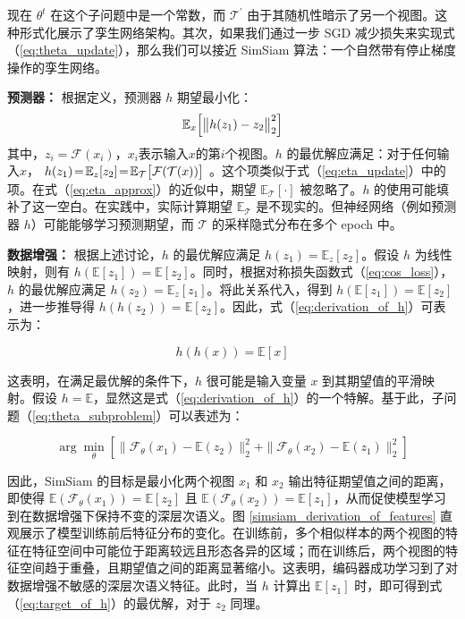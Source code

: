 \documentclass[master]{thesis-uestc}
\begin{document}
现在 $\theta^{t}$ 在这个子问题中是一个常数，而 $\mathcal{T}^{\prime}$ 由于其随机性暗示了另一个视图。这种形式化展示了孪生网络架构。其次，如果我们通过一步 SGD 减少损失来实现式（\ref{eq:theta_update}），那么我们可以接近 SimSiam 算法：一个自然带有停止梯度操作的孪生网络。

\textbf{预测器：} 根据定义，预测器 $h$ 期望最小化：
\begin{equation}
\mathbb{E}_{x}\Big{[}\big{\|}h(z_{1})-z_{2}\big{\|}_{2}^{2}\Big{]} 
\label{eq:target_of_h}
\end{equation}
其中，$z_i = \mathcal{F}(x_i)$，$x_i$表示输入$x$的第$i$个视图。$h$ 的最优解应满足：对于任何输入$x$， $h(z_{1})\!=\!\mathbb{E}_{z}[z_{2}]\!=\!\mathbb{E}_{\mathcal{T}}\big{[}\mathcal{F}( \mathcal{T}(x))\big{]}$ 。这个项类似于式（\ref{eq:eta_update}）中的项。在式（\ref{eq:eta_approx}）的近似中，期望 $\mathbb{E}_{\mathcal{T}}[\cdot]$ 被忽略了。$h$ 的使用可能填补了这一空白。在实践中，实际计算期望 $\mathbb{E}_{\mathcal{T}}$ 是不现实的。但神经网络（例如预测器 $h$）可能能够学习预测期望，而 $\mathcal{T}$ 的采样隐式分布在多个 epoch 中。

\textbf{数据增强：} 根据上述讨论，$h$ 的最优解应满足 $h(z_1) = \mathbb{E}_z[z_2]$。假设 $h$ 为线性映射，则有 $h(\mathbb{E}[z_1]) = \mathbb{E}[z_2]$。同时，根据对称损失函数式（\ref{eq:cos_loss}），$h$ 的最优解应满足 $h(z_2) = \mathbb{E}_z[z_1]$。将此关系代入，得到 $h(\mathbb{E}[z_1]) = \mathbb{E}[z_2]$，进一步推导得 $h(h(z_2)) = \mathbb{E}[z_2]$。因此，式（\ref{eq:derivation_of_h}）可表示为：

\begin{equation}
    h(h(x)) = \mathbb{E}[x]
    \label{eq:derivation_of_h}
\end{equation}

这表明，在满足最优解的条件下，$h$ 很可能是输入变量 $x$ 到其期望值的平滑映射。假设 $h = \mathbb{E}$，显然这是式（\ref{eq:derivation_of_h}）的一个特解。基于此，子问题（\ref{eq:theta_subproblem}）可以表述为：

\begin{equation}
    \arg\min_{\theta} \left[\| \mathcal{F}_{\theta}(x_1) - \mathbb{E}(z_2) \|_2^2 + \| \mathcal{F}_{\theta}(x_2) - \mathbb{E}(z_1) \|_2^2 \right]
\end{equation}

因此，SimSiam 的目标是最小化两个视图 \( x_1 \) 和 \( x_2 \) 输出特征期望值之间的距离，即使得 \( \mathbb{E}(\mathcal{F}_\theta(x_1)) = \mathbb{E}[z_2] \) 且 \( \mathbb{E}(\mathcal{F}_\theta(x_2)) = \mathbb{E}[z_1] \)，从而促使模型学习到在数据增强下保持不变的深层次语义。图 \ref{simsiam_derivation_of_features} 直观展示了模型训练前后特征分布的变化。在训练前，多个相似样本的两个视图的特征在特征空间中可能位于距离较远且形态各异的区域；而在训练后，两个视图的特征空间趋于重叠，且期望值之间的距离显著缩小。这表明，编码器成功学习到了对数据增强不敏感的深层次语义特征。此时，当 \( h \) 计算出 \( \mathbb{E}[z_1] \) 时，即可得到式（\ref{eq:target_of_h}）的最优解，对于 \( z_2 \) 同理。
\end{document}
